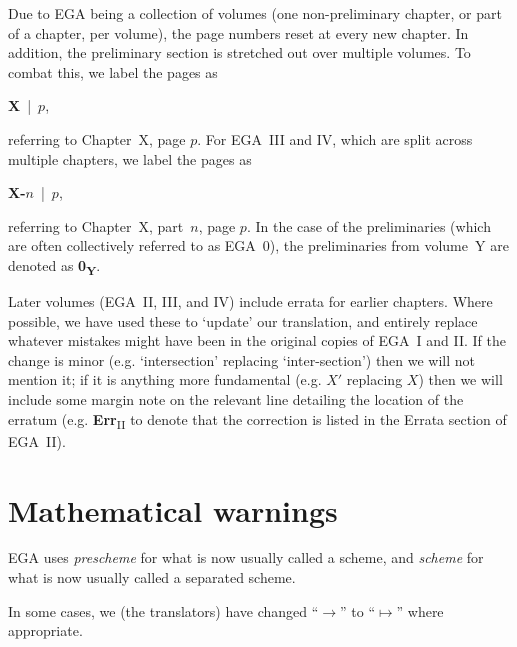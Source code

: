 Due to EGA being a collection of volumes (one non-preliminary chapter, or part of a chapter, per volume), the page numbers reset at every new chapter.
In addition, the preliminary section is stretched out over multiple volumes.
To combat this, we label the pages as
\begin{center}
  \textbf{X}~|~$p$,
\end{center}
referring to Chapter~X, page $p$.
For EGA~III and IV, which are split across multiple chapters, we label the pages as
\begin{center}
  \textbf{X-$n$}~|~$p$,
\end{center}
referring to Chapter~X, part~$n$, page $p$.
In the case of the preliminaries (which are often collectively referred to as EGA~0), the preliminaries from volume~Y are denoted as \textbf{0\textsubscript{Y}}.

\sectionbreak

Later volumes (EGA~II, III, and IV) include errata for earlier chapters.
Where possible, we have used these to `update' our translation, and entirely replace whatever mistakes might have been in the original copies of EGA~I and II.
If the change is minor (e.g. `intersection' replacing `inter-section') then we will not mention it; if it is anything more fundamental (e.g. $X'$ replacing $X$) then we will include some margin note on the relevant line detailing the location of the erratum (e.g. \textbf{Err}\textsubscript{II} to denote that the correction is listed in the Errata section of EGA~II).

\section*{Mathematical warnings}
EGA uses \emph{prescheme} for what is now usually called a scheme, and \emph{scheme} for what is now usually called a separated scheme.

In some cases, we (the translators) have changed ``$\to$'' to ``$\mapsto$'' where appropriate.



